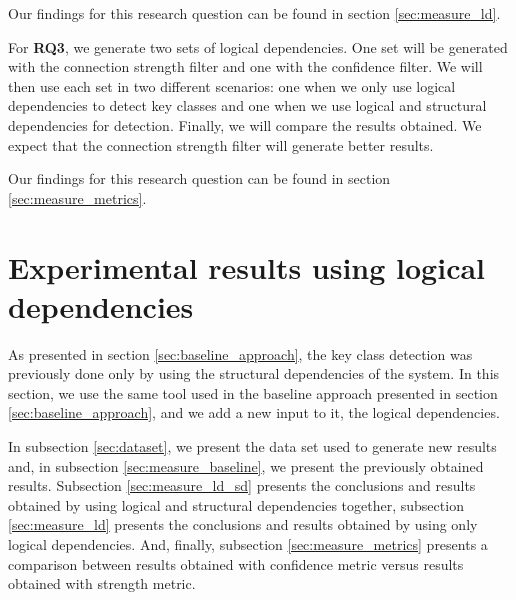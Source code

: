 \documentclass[runningheads]{comsis2}
\begin{document}
\medskip

\noindent{}

\medskip

Our findings for this research question can be found in section \ref{sec:measure_ld}.

For \textbf {RQ3}, we generate two sets of logical dependencies. One set will be generated with the connection strength filter and one with the confidence filter. We will then use each set in two different scenarios: one when we only use logical dependencies to detect key classes and one when we use logical and structural dependencies for detection. Finally, we will compare the results obtained. We expect that the connection strength filter will generate better results. 

\medskip

\noindent{}

\medskip
Our findings for this research question can be found in section \ref{sec:measure_metrics}.

\section{Experimental results using logical dependencies}
\label{sec:current_measurements}


As presented in section \ref{sec:baseline_approach}, the key class detection was previously done only by using the structural dependencies of the system. 
In this section, we use the same tool used in the baseline approach presented in section \ref{sec:baseline_approach}, and we add a new input to it, the logical dependencies. 

In subsection \ref{sec:dataset}, we present the data set used to generate new results and, in subsection \ref{sec:measure_baseline}, we present the previously obtained results. Subsection \ref{sec:measure_ld_sd} presents the conclusions and results obtained by using logical and structural dependencies together, subsection \ref{sec:measure_ld} presents the conclusions and results obtained by using only logical dependencies. And, finally, subsection \ref{sec:measure_metrics} presents a comparison between results obtained with confidence metric versus results obtained with strength metric.
\end{document}
